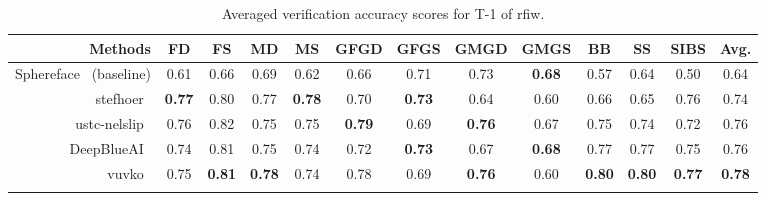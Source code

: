 \documentclass[letterpaper, 10 pt, conference]{ieeeconf}
\newcommand{\ie}{\textit{i}.\textit{e}., }
\begin{document}
\begin{table}[t]
\scriptsize
\centering
\caption {Averaged verification accuracy scores for T-1 of \ac{rfiw}.}%
\label{tab:benchmark:track1}
\begin{tabular}{r|cccc|cccc|ccc|c}
  Methods & FD & FS & MD & MS & GFGD & GFGS & GMGD & GMGS & BB & SS & SIBS & Avg. \\

  \midrule
  Sphereface~\cite{Liu_2017_CVPR} (baseline) & 0.61 & 0.66 & 0.69 & 0.62 & 0.66 &0.71& 0.73 & \textbf{0.68} & 0.57 & 0.64 & 0.50 & 0.64\\
    stefhoer~\cite{id2} & \textbf{0.77} & 0.80 & 0.77 & \textbf{0.78} & 0.70 & \textbf{0.73} & 0.64 & 0.60 & 0.66 & 0.65 & 0.76 & 0.74\\
     ustc-nelslip~\cite{id6} & 0.76 & 0.82 & 0.75 & 0.75 & \textbf{0.79} & 0.69 & \textbf{0.76} & 0.67 & 0.75 & 0.74 & 0.72 & 0.76\\
     DeepBlueAI~\cite{id3} & 0.74 & 0.81 & 0.75 & 0.74 & 0.72 & \textbf{0.73} & 0.67 & \textbf{0.68} & 0.77 & 0.77 & 0.75 & 0.76\\
  vuvko~\cite{id4}& 0.75 & \textbf{0.81} & \textbf{0.78} & 0.74 & 0.78 & 0.69 & \textbf{0.76} & 0.60 & \textbf{0.80} & \textbf{0.80} & \textbf{0.77} & \textbf{0.78}\\\vspace{-5mm}
\end{tabular}
\end{table}




\end{document}
